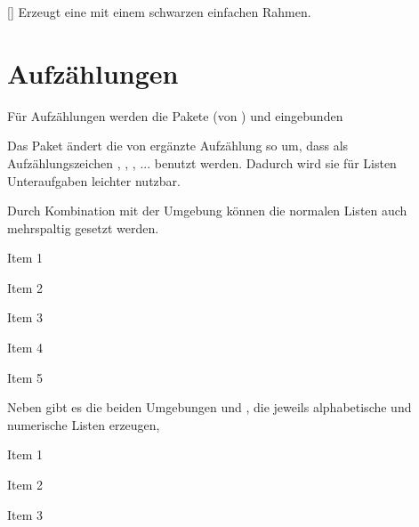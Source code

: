 \begin{environments}
	[]
	Erzeugt eine  mit einem schwarzen einfachen Rahmen.
	
	\begin{example}
	\begin{rahmen}
	\blindtext
	\end{rahmen}
	\end{example}
\end{environments}


\section{Aufzählungen}\label{sec:aufzaehlungen}
Für Aufzählungen werden die Pakete  (von ) und  eingebunden

Das Paket ändert die von  ergänzte Aufzählung  so um, dass als Aufzählungszeichen , , , ... benutzt werden. Dadurch wird sie für Listen Unteraufgaben leichter nutzbar.

Durch Kombination mit der Umgebung  können die normalen Listen auch mehrspaltig gesetzt werden.

\begin{example}
	\begin{multicols}{3}
		\begin{smallenumerate}
			\item Item 1
			\item Item 2
			\item Item 3
			\item Item 4
			\item Item 5
		\end{smallenumerate}
	\end{multicols}
\end{example}

Neben  gibt es die beiden Umgebungen  und , die jeweils alphabetische und numerische Listen erzeugen,

\begin{example}
	\begin{multicols}{3}
		\begin{enumeratea}
			\item Item 1
			\item Item 2
			\item Item 3
		\end{enumeratea}
	\end{multicols}
\end{example}


